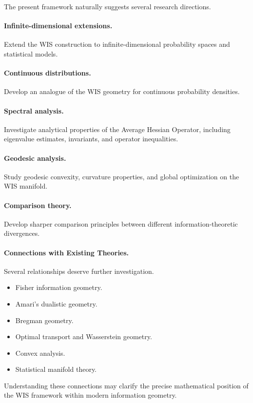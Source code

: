 The present framework naturally suggests several research directions.

\paragraph{Infinite-dimensional extensions.}
Extend the WIS construction to infinite-dimensional probability spaces
and statistical models.

\paragraph{Continuous distributions.}
Develop an analogue of the WIS geometry for continuous probability
densities.

\paragraph{Spectral analysis.}
Investigate analytical properties of the Average Hessian Operator,
including eigenvalue estimates, invariants, and operator inequalities.

\paragraph{Geodesic analysis.}
Study geodesic convexity, curvature properties, and global optimization
on the WIS manifold.

\paragraph{Comparison theory.}
Develop sharper comparison principles between different
information-theoretic divergences.

\paragraph{Connections with Existing Theories.}
Several relationships deserve further investigation.
\begin{itemize}
\item Fisher information geometry.
\item Amari's dualistic geometry.
\item Bregman geometry.
\item Optimal transport and Wasserstein geometry.
\item Convex analysis.
\item Statistical manifold theory.
\end{itemize}
Understanding these connections may clarify the precise mathematical
position of the WIS framework within modern information geometry.


